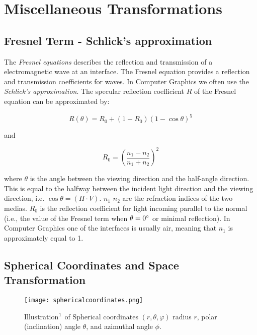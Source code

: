 \chapter{Miscellaneous Transformations}
\section{Fresnel Term - Schlick's approximation}
The \emph{Fresnel equations} describes the reflection and transmission of a electromagnetic wave at an interface. The Fresnel equation provides a reflection and transmission coefficients for waves. In Computer Graphics we often use the \emph{Schlick's approximation}. The specular reflection coefficient $R$ of the Fresnel equation can be approximated by:

\begin{equation}
 R(\theta) = R_0 + (1 - R_0)(1 - \cos \theta)^5
\label{eq:schlickapprox}
\end{equation}

and

\begin{equation*}
  R_0 = \left(\frac{n_1-n_2}{n_1+n_2}\right)^2
\end{equation*}

where $\theta$ is the angle between the viewing direction and the half-angle direction. This is equal to the halfway between the incident 
light direction and the viewing direction, i.e. $\cos \theta = (H \cdot V)$. $n_1$ $n_2$ are the refraction indices of the two medias. $R_0$ is the reflection coefficient for light incoming parallel to the normal (i.e., the value of the Fresnel term when $\theta = 0 \degree$ or minimal reflection). In Computer Graphics one of the interfaces is usually air, meaning that $n_1$ is approximately equal to 1.

\section{Spherical Coordinates and Space Transformation}
\label{sec:sphericalcoordinates}
\begin{figure}[H]
  \centering
  \texttt{[image: sphericalcoordinates.png]}
  \caption[Illustration of Spherical Coordinate System]{Illustration$\footnotemark$ of Spherical coordinates $(r,θ,φ)$ radius $r$, polar (inclination) angle $\theta$, and azimuthal angle $\phi$.}
  \label{fig:sphericalcoordinatesystem}
\end{figure}

